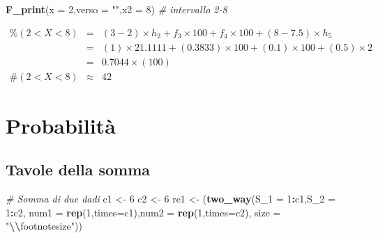 \documentclass[
  11pt,
]{book}
\newenvironment{Shaded}{\begin{snugshade}}{\end{snugshade}}
\newcommand{\AttributeTok}[1]{\textcolor[rgb]{0.13,0.29,0.53}{#1}}
\newcommand{\CommentTok}[1]{\textcolor[rgb]{0.56,0.35,0.01}{\textit{#1}}}
\newcommand{\DecValTok}[1]{\textcolor[rgb]{0.00,0.00,0.81}{#1}}
\newcommand{\FunctionTok}[1]{\textcolor[rgb]{0.13,0.29,0.53}{\textbf{#1}}}
\newcommand{\NormalTok}[1]{#1}
\newcommand{\OtherTok}[1]{\textcolor[rgb]{0.56,0.35,0.01}{#1}}
\newcommand{\SpecialCharTok}[1]{\textcolor[rgb]{0.81,0.36,0.00}{\textbf{#1}}}
\newcommand{\StringTok}[1]{\textcolor[rgb]{0.31,0.60,0.02}{#1}}
\theoremstyle{mytheoremstyle}
\theoremstyle{mydefstyle}
\begin{document}
\begin{Shaded}
\begin{Highlighting}[]
\FunctionTok{F\_print}\NormalTok{(}\AttributeTok{x =} \DecValTok{2}\NormalTok{,}\AttributeTok{verso =} \StringTok{""}\NormalTok{,}\AttributeTok{x2 =} \DecValTok{8}\NormalTok{) }\CommentTok{\# intervallo 2{-}8}
\end{Highlighting}
\end{Shaded}

\begin{eqnarray*} \%(2<X<8) &=& (3-2)\times h_{2}+ f_{ 3 }\times 100+f_{ 4 }\times 100 + (8-7.5)\times h_{5}  \\ 
 &=& (1)\times 21.1111+ ( 0.3833 )\times 100+( 0.1 )\times 100 + (0.5)\times 2  \\ 
 &=&  0.7044 \times(100)\\
     \#( 2 < X < 8 ) &\approx& 42 
         \end{eqnarray*}

\section{Probabilità}\label{probabilituxe0}

\subsection{Tavole della somma}\label{tavole-della-somma}

\begin{Shaded}
\begin{Highlighting}[]
\CommentTok{\# Somma di due dadi}
\NormalTok{c1 }\OtherTok{\textless{}{-}} \DecValTok{6}
\NormalTok{c2 }\OtherTok{\textless{}{-}} \DecValTok{6}
\NormalTok{re1 }\OtherTok{\textless{}{-}}\NormalTok{ (}\FunctionTok{two\_way}\NormalTok{(}\AttributeTok{S\_1 =} \DecValTok{1}\SpecialCharTok{:}\NormalTok{c1,}\AttributeTok{S\_2 =} \DecValTok{1}\SpecialCharTok{:}\NormalTok{c2,}
                \AttributeTok{num1 =} \FunctionTok{rep}\NormalTok{(}\DecValTok{1}\NormalTok{,}\AttributeTok{times=}\NormalTok{c1),}\AttributeTok{num2 =} \FunctionTok{rep}\NormalTok{(}\DecValTok{1}\NormalTok{,}\AttributeTok{times=}\NormalTok{c2),}
                \AttributeTok{size =} \StringTok{"}\SpecialCharTok{\textbackslash{}\textbackslash{}}\StringTok{footnotesize"}\NormalTok{))}
\end{Highlighting}
\end{Shaded}

\footnotesize
\end{document}

